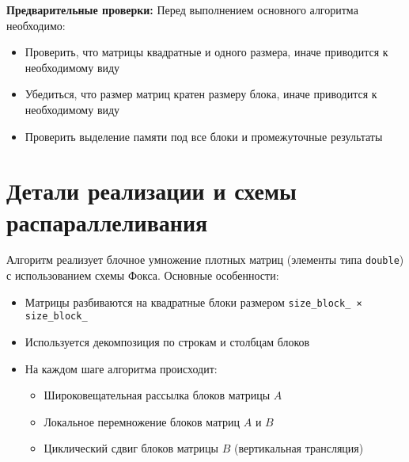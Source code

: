 \documentclass[12pt]{article}
\begin{document}
\textbf{Предварительные проверки:}
Перед выполнением основного алгоритма необходимо:
\begin{itemize}
    \item Проверить, что матрицы квадратные и одного размера, иначе приводится к необходимому виду
    \item Убедиться, что размер матриц кратен размеру блока, иначе приводится к необходимому виду
    \item Проверить выделение памяти под все блоки и промежуточные результаты
\end{itemize}



\newpage
\section{Детали реализации и схемы распараллеливания}

Алгоритм реализует блочное умножение плотных матриц (элементы типа \texttt{double}) с использованием схемы Фокса. Основные особенности:
\begin{itemize}
    \item Матрицы разбиваются на квадратные блоки размером \texttt{size\_block\_ × size\_block\_}
    \item Используется декомпозиция по строкам и столбцам блоков
    \item На каждом шаге алгоритма происходит:
    \begin{itemize}
        \item Широковещательная рассылка блоков матрицы $A$ 
        \item Локальное перемножение блоков матриц $A$ и $B$
        \item Циклический сдвиг блоков матрицы $B$ (вертикальная трансляция)
    \end{itemize}
\end{itemize}
\end{document}
